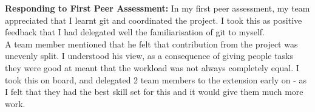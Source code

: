 \documentclass[11pt]{article}
\begin{document}
\textbf{Responding to First Peer Assessment:} In my first peer assessment, my team appreciated that I learnt git and coordinated the project. I took this as positive feedback that I had delegated well the familiarisation of git to myself.\\
A team member mentioned that he felt that contribution from the project was unevenly split. I understood his view, as a consequence of giving people tasks they were good at meant that the workload was not always completely equal. I took this on board, and delegated 2 team members to the extension early on - as I felt that they had the best skill set for this and it would give them much more work.
\end{document}
